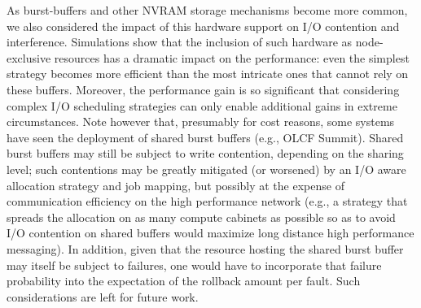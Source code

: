 \documentclass[two]{article}
\newcommand{\ie}[0]{\emph{i.e.}\xspace}
\begin{document}

As burst-buffers and other NVRAM storage mechanisms become more
common, we also considered the impact of this hardware support on I/O
contention and interference. Simulations show that the inclusion of
such hardware as node-exclusive resources has a dramatic impact on the performance: even the
simplest strategy becomes more efficient than the most intricate ones
that cannot rely on these buffers. Moreover,
the performance gain is so significant that considering complex I/O
scheduling strategies can only enable additional gains in extreme
circumstances.
 Note however that, presumably for cost reasons, 
some systems have seen the deployment 
of shared burst buffers (e.g., OLCF Summit). Shared burst buffers 
may still be subject to write contention, depending on the sharing level; 
such contentions may be greatly mitigated (or worsened) by an I/O aware 
allocation strategy and job mapping, but possibly at the expense of 
communication efficiency on the high performance network (e.g., a strategy 
that spreads the allocation on as many compute cabinets as possible so as to 
avoid I/O contention on shared buffers would maximize long distance high 
performance messaging). In addition, given that the resource hosting the 
shared burst buffer may itself be subject to failures, one would have to
incorporate that failure probability into the expectation of the 
rollback amount per fault. Such considerations are left for future work.
\end{document}
